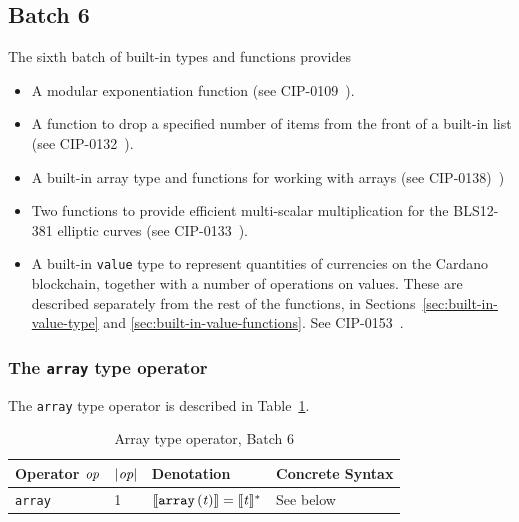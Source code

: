 \renewcommand{\note}[1]{
  \bigskip
  \refstepcounter{notenumberF}
  \noindent\textbf{Note \thenotenumberF. #1}
}
\newpage
\subsection{Batch 6}
\label{sec:default-builtins-6}
The sixth batch of built-in types and functions provides
\begin{itemize}
\item A modular exponentiation function (see CIP-0109~\cite{CIP-0109}).
\item A function to drop a specified number of items from the front of a built-in list (see CIP-0132~\cite{CIP-0132}).
\item A built-in array type and functions for working with arrays (see CIP-0138)~\cite{CIP-0138})
\item Two functions to provide efficient multi-scalar multiplication for the BLS12-381 elliptic curves (see CIP-0133~\cite{CIP-0133}).
\item A built-in \texttt{value} type to represent quantities of currencies on the
      Cardano blockchain, together with a number of operations on values. These
      are described separately from the rest of the functions, in
      Sections~\ref{sec:built-in-value-type} and \ref{sec:built-in-value-functions}. See CIP-0153~\cite{CIP-0153}.
\end{itemize}

\subsubsection{The \texttt{array} type operator}
\label{sec:built-in-array-type}
The \texttt{array} type operator is described in Table~\ref{table:array-type-operator}.

\begin{table}[H]
  \centering
    \begin{tabular}{|l|p{14mm}|l|l|}
        \hline
        Operator $\textit{op}$ & $\left|\textit{op}\right|$  & Denotation & Concrete Syntax\\
        \hline
        \texttt{array}
          & 1
          & $\llbracket\mathit{\mathtt{array}\,\mathtt{(}t\mathtt{)}}\rrbracket = \llbracket\mathit{t}\rrbracket^*$
          & See below\\
        \hline
        \end{tabular}
   \caption{Array type operator, Batch 6}
    \label{table:array-type-operator}
\end{table}

